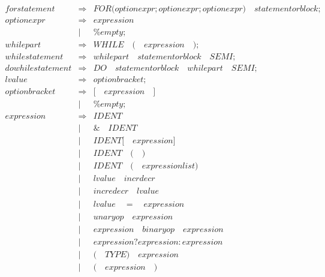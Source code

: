 \documentclass{article}
\begin{document}
\begin{eqnarray}
   \mathit{forstatement} & \Rightarrow & \mathit{FOR} \mathit{(} \mathit{optionexpr;optionexpr;optionexpr)}\quad \mathit{statementorblock};\\
   \mathit{optionexpr} & \Rightarrow & \mathit{expression} \\
   &  | & \mathit{\%empty};\\
   \mathit{whilepart} & \Rightarrow & \mathit{WHILE}\quad \mathit{(} \quad \mathit{expression}\quad\mathit{)} ; \\
   \mathit{whilestatement} & \Rightarrow & \mathit{whilepart} \quad \mathit{statementorblock} \quad \mathit{SEMI} ; \\
   \mathit{dowhilestatement} & \Rightarrow & \mathit{DO} \quad \mathit{statementorblock} \quad \mathit{whilepart} \quad \mathit{SEMI} ; \\
   \mathit{lvalue} & \Rightarrow & \mathit{optionbracket} ; \\
   \mathit{optionbracket} & \Rightarrow & \mathit{[}\quad\mathit{expression}\quad\mathit{]}\\
   &|& \mathit{\%empty};\\
   \mathit{expression} & \Rightarrow & \mathit{IDENT}\\
    & | & \mathit{\&} \quad \mathit{IDENT}\\
    & | & \mathit{IDENT} \mathit{[}\quad\mathit{expression}\mathit{]}\\
    & | & \mathit{IDENT}\quad\mathit{(}\quad\mathit{)} \\
    & | & \mathit{IDENT} \quad \mathit{(} \quad\mathit{expressionlist} \mathit{)}\\
    & | & \mathit{lvalue} \quad \mathit{incrdecr} \\
    & | & \mathit{incredecr} \quad \mathit{lvalue} \\
    & | & \mathit{lvalue} \quad \mathit{=} \quad \mathit{expression}\\
    & | & \mathit{unaryop} \quad \mathit{expression}\\
    & | & \mathit{expression} \quad \mathit{binaryop} \quad \mathit{expression}\\
    & | & \mathit{expression} \mathit{?} \mathit{expression}\mathit{:}\mathit{expression}\\
    & | & \mathit{(}\quad\mathit{TYPE}\mathit{)}\quad\mathit{expression}\\
    & | & \mathit{(}\quad\mathit{expression}\quad\mathit{)}\\

\end{eqnarray}
\end{document}
